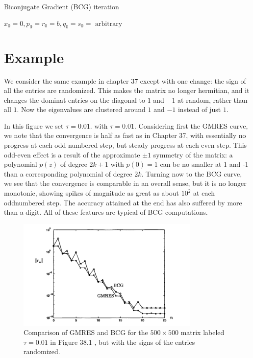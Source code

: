 \begin{algorithm}[H]
    \caption{Biconjugate Gradient (BCG) iteration}
    \label{Algo 39.1}
    $ x_0=0, p_0=r_0=b, q_0=s_0=\text { arbitrary } $\; 
\end{algorithm}

\section{Example} 
We consider the same example in chapter 37 except with one change: the sign of all the entries are randomized. This makes the matrix no longer hermitian, and it changes the dominat entries on the diagonal to $ 1 $ and $ -1 $ at random, rather than all $1 $. Now the eigenvalues are clustered around $ 1 $ and $ -1 $ instead of just $ 1 $. 

In this figure we set $ \tau = 0.01 $. with $\tau=0.01$. Considering first the GMRES curve, we note that the convergence is half as fast as in Chapter 37, with essentially no progress at each odd-numbered step, but steady progress at each even step. This odd-even effect is a result of the approximate $\pm 1$ symmetry of the matrix: a polynomial $p(z)$ of degree $2 k+1$ with $p(0)=1$ can be no smaller at 1 and -1 than a corresponding polynomial of degree $2 k$. Turning now to the BCG curve, we see that the convergence is comparable in an overall sense, but it is no longer monotonic, showing spikes of magnitude as great as about $10^2$ at each oddnumbered step. The accuracy attained at the end has also suffered by more than a digit. All of these features are typical of BCG computations.
\begin{figure}[H]
    \centering
    \includegraphics[width=0.8\textwidth]{figures/39-2.png}
    \caption{Comparison of GMRES and BCG for the $500 \times 500$ matrix labeled $\tau=0.01$ in Figure 38.1 , but with the signs of the entries randomized.}
\end{figure}

